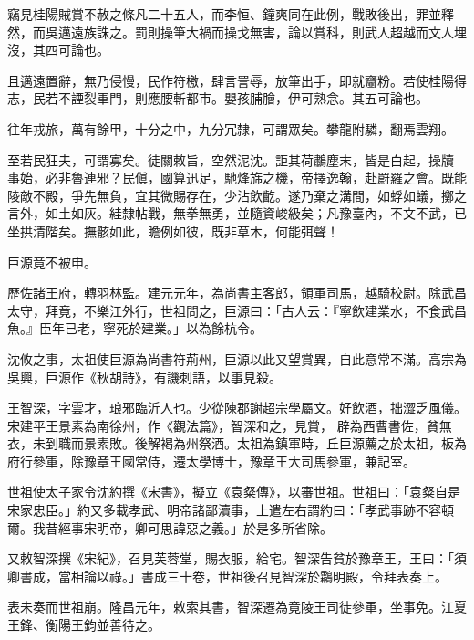 \begin{pinyinscope}
 竊見桂陽賊賞不赦之條凡二十五人，而李恒、鐘爽同在此例，戰敗後出，罪並釋然，而吳邁遠族誅之。罰則操筆大禍而操戈無害，論以賞科，則武人超越而文人埋沒，其四可論也。



 且邁遠置辭，無乃侵慢，民作符檄，肆言詈辱，放筆出手，即就齏粉。若使桂陽得志，民若不諲裂軍門，則應腰斬都市。嬰孩脯膾，伊可熟念。其五可論也。



 往年戎旅，萬有餘甲，十分之中，九分冗隸，可謂眾矣。攀龍附驎，翻焉雲翔。



 至若民狂夫，可謂寡矣。徒關敕旨，空然泥沈。詎其荷鷫塵末，皆是白起，操牘
 事始，必非魯連邪？民傎，國算迅足，馳烽旆之機，帝擇逸翰，赴罻羅之會。既能陵敵不殿，爭先無負，宜其微賜存在，少沾飲齕。遂乃棄之溝間，如蜉如蟻，擲之言外，如土如灰。絓隸帖戰，無拳無勇，並隨資峻級矣；凡豫臺內，不文不武，已坐拱清階矣。撫骸如此，瞻例如彼，既非草木，何能弭聲！



 巨源竟不被申。



 歷佐諸王府，轉羽林監。建元元年，為尚書主客郎，領軍司馬，越騎校尉。除武昌太守，拜竟，不樂江外行，世祖問之，巨源曰：「古人云：『寧飲建業水，不食武昌魚。』臣年已老，寧死於建業。」以為餘杭令。



 沈攸之事，太祖使巨源為尚書符荊州，巨源以此又望賞異，自此意常不滿。高宗為吳興，巨源作《秋胡詩》，有譏刺語，以事見殺。



 王智深，字雲才，琅邪臨沂人也。少從陳郡謝超宗學屬文。好飲酒，拙澀乏風儀。宋建平王景素為南徐州，作《觀法篇》，智深和之，見賞，
 辟為西曹書佐，貧無衣，未到職而景素敗。後解褐為州祭酒。太祖為鎮軍時，丘巨源薦之於太祖，板為府行參軍，除豫章王國常侍，遷太學博士，豫章王大司馬參軍，兼記室。



 世祖使太子家令沈約撰《宋書》，擬立《袁粲傳》，以審世祖。世祖曰：「袁粲自是宋家忠臣。」約又多載孝武、明帝諸鄙瀆事，上遣左右謂約曰：「孝武事跡不容頓爾。我昔經事宋明帝，卿可思諱惡之義。」於是多所省除。



 又敕智深撰《宋紀》，召見芙蓉堂，賜衣服，給宅。智深告貧於豫章王，王曰：「須卿書成，當相論以祿。」書成三十卷，世祖後召見智深於鸘明殿，令拜表奏上。



 表未奏而世祖崩。隆昌元年，敕索其書，智深遷為竟陵王司徒參軍，坐事免。江夏王鋒、衡陽王鈞並善待之。




\end{pinyinscope}
